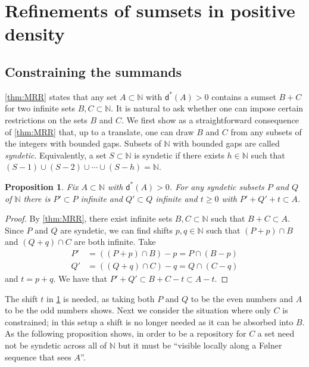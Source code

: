 \documentclass[10pt,dvipsnames]{article}
\newtheorem{proposition}[theorem]{Proposition}
\theoremstyle{definition}
\theoremstyle{plain}
\newcommand{\define}[1]{\textit{#1}}
\newcommand{\N}{\mathbb{N}}
\newcommand{\ubdens}{\mathsf{d}^*}
\newcommand{\Folner}{F\o{}lner}
\begin{document}
\section{Refinements of sumsets in positive density}
\label{sec:refinements}



\subsection{Constraining the summands}

\cref{thm:MRR} states that any set $A\subset\N$ with $\ubdens(A)>0$ contains a sumset $B+C$ for two infinite sets $B,C\subset\N$.
It is natural to ask whether one can impose certain restrictions on the sets $B$ and $C$.
We first show as a straightforward consequence of \cref{thm:MRR} that, up to a translate, one can draw $B$ and $C$ from any subsets of the integers with bounded gaps. 
Subsets of $\N$ with bounded gaps are called \define{syndetic}. 
Equivalently, a set $S \subset \N$ is syndetic if there exists $h\in\N$ such that $(S-1) \cup (S-2) \cup \cdots \cup (S-h) = \N$.


\begin{proposition}
\label{prop_syndeticB+C}
Fix $A \subset \N$ with $\ubdens(A) > 0$.
For any syndetic subsets $P$ and $Q$ of $\N$ there is $P' \subset P$ infinite and $Q' \subset Q$ infinite and $t \ge 0$ with $P' + Q' + t \subset A$.
\end{proposition}
\begin{proof}
By \cref{thm:MRR}, there exist infinite sets $B,C\subset\N$ such that $B+C\subset A$.
Since $P$ and $Q$ are syndetic, we can find shifts $p,q\in\N$ such that $(P+p)\cap B$ and $(Q+q)\cap C$ are both infinite.
Take
\begin{align*}
P' &= ((P+p)\cap B)-p=P\cap(B-p) \\
Q' &= ((Q+q)\cap C)-q=Q\cap(C-q)
\end{align*} 
and $t=p+q$.
We have that  $P'+Q'\subset B+C-t\subset A-t$.
\end{proof}

The shift $t$  in \cref{prop_syndeticB+C} is needed, as taking both $P$ and $Q$ to be the even numbers and $A$ to be the odd numbers shows.
Next we consider the situation where only $C$ is constrained; in this setup a shift is no longer needed as it can be absorbed into $B$.
As the following proposition shows, in order to be a repository for $C$ a set need not be syndetic across all of $\N$ but it must be ``visible locally along a \Folner{} sequence that sees $A$''.
\end{document}
